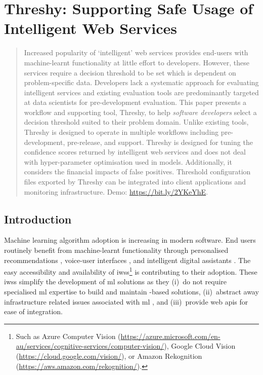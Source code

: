 \chapter[An Implementation of the Threshold Tuner Component]
{Threshy: Supporting Safe Usage of Intelligent Web Services}
\label{ch:fse-demo2020}
\graphicspath{{mainmatter/publications/figures/fse-demo2020/}}

\def\demolink{https://bit.ly/2YKeYhE}
\def\demogooglelink{http://bit.ly/a2i2-threshy}

\glsresetall
\begin{abstract}
Increased popularity of `intelligent' web services provides end-users with machine-learnt functionality at little effort to developers. However, these services require a decision threshold to be set which is dependent on problem-specific data. Developers lack a systematic approach for evaluating intelligent services and existing evaluation tools are predominantly targeted at data scientists for pre-development evaluation. This paper presents a workflow and supporting tool, Threshy, to help \textit{software developers} select a decision threshold suited to their problem domain. Unlike existing tools, Threshy is designed to operate in multiple workflows including pre-development, pre-release, and support. Threshy is designed for tuning the confidence scores returned by intelligent web services and does not deal with hyper-parameter optimisation used in  models. Additionally, it considers the financial impacts of false positives.
Threshold configuration files exported by Threshy can be integrated into client applications and monitoring infrastructure. Demo: \url{\demolink}.
\end{abstract}
\glsresetall
{}

\section{Introduction}

Machine learning algorithm adoption is increasing in modern software. End users routinely benefit from machine-learnt functionality through personalised recommendations \citep{covington2016deep}, voice-user interfaces \citep{myers2018patterns}, and intelligent digital assistants \citep{boyd2018just}. The easy accessibility and availability of \glspl{iws}\footnote{Such as Azure Computer Vision (\url{https://azure.microsoft.com/en-au/services/cognitive-services/computer-vision/}), Google Cloud Vision (\url{https://cloud.google.com/vision/}), or Amazon Rekognition (\url{https://aws.amazon.com/rekognition/}).} is contributing to their adoption. These \glspl{iws} simplify the development of \gls{ml} solutions as they (i)~do not require specialised \gls{ml} expertise to build and maintain -based solutions, (ii)~abstract away infrastructure related issues associated with \gls{ml} \citep{Sculley2015, Arpteg2018}, and (iii)~provide web \glspl{api} for ease of integration. 

